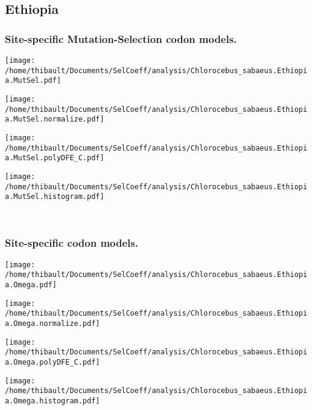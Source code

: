 \subsection{Ethiopia} 
 
\subsubsection*{Site-specific Mutation-Selection codon models.} 
\begin{minipage}{0.49\linewidth} 
\texttt{[image: /home/thibault/Documents/SelCoeff/analysis/Chlorocebus\_sabaeus.Ethiopia.MutSel.pdf]} 
\end{minipage}
\begin{minipage}{0.49\linewidth} 
\texttt{[image: /home/thibault/Documents/SelCoeff/analysis/Chlorocebus\_sabaeus.Ethiopia.MutSel.normalize.pdf]} 
\end{minipage}
\begin{minipage}{0.49\linewidth} 
\texttt{[image: /home/thibault/Documents/SelCoeff/analysis/Chlorocebus\_sabaeus.Ethiopia.MutSel.polyDFE\_C.pdf]} 
\end{minipage}
\begin{minipage}{0.49\linewidth} 
\texttt{[image: /home/thibault/Documents/SelCoeff/analysis/Chlorocebus\_sabaeus.Ethiopia.MutSel.histogram.pdf]} 
\end{minipage}
\\ 
\subsubsection*{Site-specific codon models.} 
\begin{minipage}{0.49\linewidth} 
\texttt{[image: /home/thibault/Documents/SelCoeff/analysis/Chlorocebus\_sabaeus.Ethiopia.Omega.pdf]} 
\end{minipage}
\begin{minipage}{0.49\linewidth} 
\texttt{[image: /home/thibault/Documents/SelCoeff/analysis/Chlorocebus\_sabaeus.Ethiopia.Omega.normalize.pdf]} 
\end{minipage}
\begin{minipage}{0.49\linewidth} 
\texttt{[image: /home/thibault/Documents/SelCoeff/analysis/Chlorocebus\_sabaeus.Ethiopia.Omega.polyDFE\_C.pdf]} 
\end{minipage}
\begin{minipage}{0.49\linewidth} 
\texttt{[image: /home/thibault/Documents/SelCoeff/analysis/Chlorocebus\_sabaeus.Ethiopia.Omega.histogram.pdf]} 
\end{minipage}
\\ 
